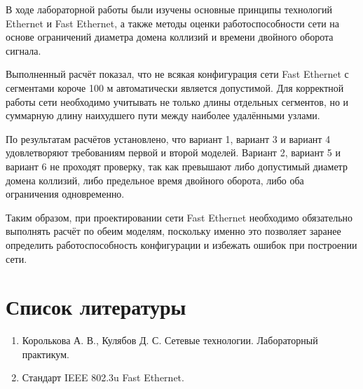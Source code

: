 \documentclass[
  english,
  russian,
  12pt,
  a4paper,
  DIV=11,
  numbers=noendperiod]{scrreprt}
\providecommand{\tightlist}{%
  \setlength{\itemsep}{0pt}\setlength{\parskip}{0pt}}
\begin{document}
В ходе лабораторной работы были изучены основные принципы технологий
Ethernet и Fast Ethernet, а также методы оценки работоспособности сети
на основе ограничений диаметра домена коллизий и времени двойного
оборота сигнала.

Выполненный расчёт показал, что не всякая конфигурация сети Fast
Ethernet с сегментами короче 100 м автоматически является допустимой.
Для корректной работы сети необходимо учитывать не только длины
отдельных сегментов, но и суммарную длину наихудшего пути между наиболее
удалёнными узлами.

По результатам расчётов установлено, что вариант 1, вариант 3 и вариант
4 удовлетворяют требованиям первой и второй моделей. Вариант 2, вариант
5 и вариант 6 не проходят проверку, так как превышают либо допустимый
диаметр домена коллизий, либо предельное время двойного оборота, либо
оба ограничения одновременно.

Таким образом, при проектировании сети Fast Ethernet необходимо
обязательно выполнять расчёт по обеим моделям, поскольку именно это
позволяет заранее определить работоспособность конфигурации и избежать
ошибок при построении сети.

\chapter{Список
литературы}\label{ux441ux43fux438ux441ux43eux43a-ux43bux438ux442ux435ux440ux430ux442ux443ux440ux44b}

\begin{enumerate}
\def\labelenumi{\arabic{enumi}.}
\tightlist
\item
  Королькова А. В., Кулябов Д. С. Сетевые технологии. Лабораторный
  практикум.
\item
  Стандарт IEEE 802.3u Fast Ethernet.
\end{enumerate}


\printbibliography
\end{document}
